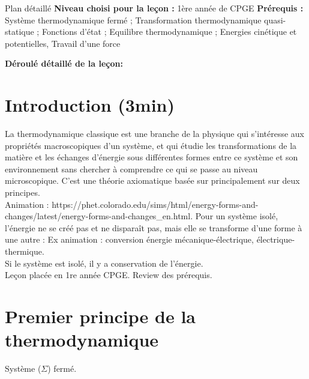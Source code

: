 \begin{reportBlock}{Plan détaillé}
  \textbf{Niveau choisi pour la leçon :} 1ère année de CPGE
  \newline
  \textbf{Prérequis :} Système thermodynamique fermé ; Transformation thermodynamique quasi-statique ; Fonctions d'état ; Equilibre thermodynamique ; Energies cinétique et potentielles, Travail d'une force 
  \newline
  
  \textbf{Déroulé détaillé de la leçon: }   \newline
  
  \section*{Introduction (3min)}
 La thermodynamique classique est une branche de la physique qui s'intéresse aux propriétés macroscopiques d'un système, et qui étudie les transformations de la matière et les échanges d'énergie sous différentes formes entre ce système et son environnement sans chercher à comprendre ce qui se passe au niveau microscopique. C'est une théorie axiomatique basée sur principalement sur deux principes.\\
  Animation : https://phet.colorado.edu/sims/html/energy-forms-and-changes/latest/energy-forms-and-changes\_en.html. Pour un système isolé, l'énergie ne se créé pas et ne disparaît pas, mais elle se transforme d'une forme à une autre : Ex animation : conversion énergie mécanique-électrique, électrique-thermique. \\
  Si le système est isolé, il y a conservation de l'énergie.  \\
  Leçon placée en 1re année CPGE. Review des prérequis.
  
  \section{Premier principe de la thermodynamique}
  Système ($\Sigma$) fermé.
  

\end{reportBlock}
